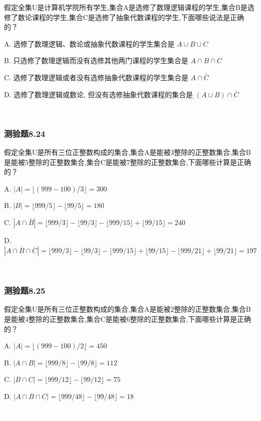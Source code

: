 \documentclass[UTF8, heading=true]{ctexart}
\begin{document}
假定全集U是计算机学院所有学生,集合A是选修了数理逻辑课程的学生,集合B是选修了数论课程的学生,集合C是选修了抽象代数课程的学生,下面哪些说法是正确的？

A. 选修了数理逻辑、数论或抽象代数课程的学生集合是 $A \cup B \cup C$

B. 只选修了数理逻辑而没有选修其他两门课程的学生集合是 $A \cap \overline{B \cap C}$

C. 选修了数理逻辑或者没有选修抽象代数课程的学生集合是 $A \cap \bar{C}$

D. 选修了数理逻辑或数论, 但没有选修抽象代数课程的集合是 $(A \cup B) \cap \bar{C}$

\textcolor{white}{答案：AD}

\subsubsection{测验题8.24}
假定全集U是所有三位正整数构成的集合,集合A是能被3整除的正整数集合,集合B是能被5整除的正整数集合,集合C是能被7整除的正整数集合,下面哪些计算是正确的？

A. $|A|=\lfloor(999-100) / 3\rfloor=300$

B. $|B|=\lfloor 999 / 5\rfloor-\lfloor 99 / 5\rfloor=180$

C. $|A \cap \bar{B}|=\lfloor 999 / 3\rfloor-\lfloor 99 / 3\rfloor-\lfloor 999 / 15\rfloor+\lfloor 99 / 15\rfloor=240$

D. $|A \cap \bar{B} \cap \bar{C}|=\lfloor 999 / 3\rfloor-\lfloor 99 / 3\rfloor-\lfloor 999 / 15\rfloor+\lfloor 99 / 15\rfloor-\lfloor 999 / 21\rfloor+\lfloor 99 / 21\rfloor=197$

\textcolor{white}{答案：BC}

\subsubsection{测验题8.25}

假定全集U是所有三位正整数构成的集合,集合A是能被2整除的正整数集合,集合B是能被4整除的正整数集合,集合C是能被6整除的正整数集合,下面哪些计算是正确的？

A. $|A|=\lfloor(999-100) / 2\rfloor=450$

B. $|A \cap B|=\lfloor 999 / 8\rfloor-\lfloor 99 / 8\rfloor=112$

C. $|B \cap C|=\lfloor 999 / 12\rfloor-\lfloor 99 / 12\rfloor=75$

D. $|A \cap B \cap C|=\lfloor 999 / 48\rfloor-\lfloor 99 / 48\rfloor=18$

\textcolor{white}{答案：C}
\end{document}
